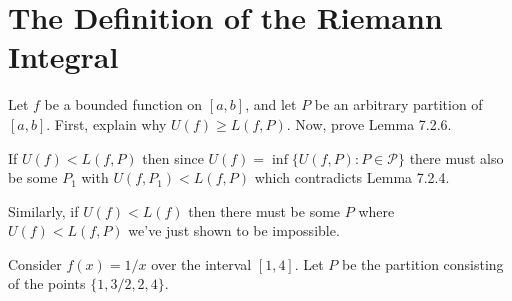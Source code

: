 \section{The Definition of the Riemann Integral}

\begin{exercise}
Let $f$ be a bounded function on $[a, b]$, and let $P$ be an arbitrary partition of $[a, b]$. First, explain why $U(f) \geq L(f, P)$. Now, prove Lemma 7.2.6.
\end{exercise}
\begin{solution}
If \(U(f) < L(f,P)\) then since \(U(f) = \inf\{U(f,P) : P \in \mathcal{P}\}\) there must also be some \(P_1\) with \(U(f, P_1) < L(f,P)\) which contradicts Lemma 7.2.4.

Similarly, if \(U(f) < L(f)\) then there must be some \(P\) where \(U(f) < L(f,P)\) we've just shown to be impossible.
\end{solution}

\begin{exercise}
Consider $f(x)=1 / x$ over the interval $[1,4]$. Let $P$ be the partition consisting of the points $\{1,3 / 2,2,4\}$.
\end{exercise}
\begin{solution}
    \TODO
\end{solution}

